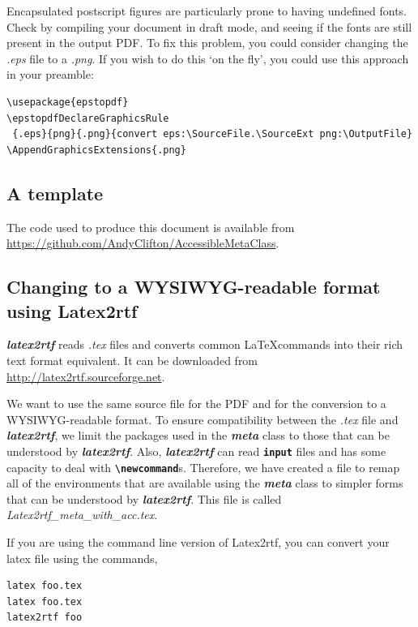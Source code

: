 \documentclass[12pt,letterpaper]{article}
\newcommand{\fn}[1]{\emph{#1}}
\newcommand{\packagename}[1]{\textbf{\emph{#1}}}
\newcommand{\envname}[1]{\textbf{\texttt{#1}}}
\begin{document}
Encapsulated postscript figures are particularly prone to having undefined fonts. Check by compiling your document in draft mode, and seeing if the fonts are still present in the output PDF. To fix this problem, you could consider changing the \emph{.eps} file to a \emph{.png}. If you wish to do this `on the fly', you could use this approach in your preamble:

\begin{verbatim}
\usepackage{epstopdf}
\epstopdfDeclareGraphicsRule
 {.eps}{png}{.png}{convert eps:\SourceFile.\SourceExt png:\OutputFile}
\AppendGraphicsExtensions{.png}
\end{verbatim}

\subsection{A template}
The code used to produce this document is available from \href{https://github.com/AndyClifton/AccessibleMetaClass}{https://github.com/AndyClifton/AccessibleMetaClass}. 

\subsection{Changing to a WYSIWYG-readable format using Latex2rtf}
\packagename{latex2rtf} reads \fn{.tex} files and converts common \LaTeX commands into their rich text format equivalent. It can be downloaded from \url{http://latex2rtf.sourceforge.net}.

We want to use the same source file for the PDF and for the conversion to a WYSIWYG-readable format. To ensure compatibility between the \fn{.tex} file and \packagename{latex2rtf}, we limit the packages used in the \packagename{meta} class to those that can be understood by \packagename{latex2rtf}. Also, \packagename{latex2rtf} can read \envname{input} files and has some capacity to deal with \envname{\textbackslash newcommand}s. Therefore, we have created a file to remap all of the environments that are available using the \packagename{meta} class to simpler forms that can be understood by \packagename{latex2rtf}. This file is called \fn{Latex2rtf\_meta\_with\_acc.tex}. 

If you are using the command line version of Latex2rtf, you can convert your latex file using the commands,

\begin{verbatim}
latex foo.tex
latex foo.tex
latex2rtf foo
\end{verbatim}
\end{document}
